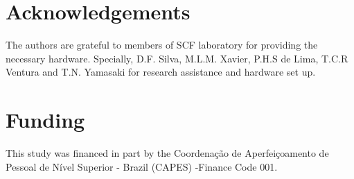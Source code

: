 
\section*{Acknowledgements}
The authors are grateful to members of SCF laboratory for providing the necessary hardware. Specially, D.F. Silva, M.L.M. Xavier, P.H.S de Lima, T.C.R Ventura and T.N. Yamasaki for research assistance and hardware set up.

\section*{Funding}
This study was financed in part by the Coordenação de Aperfeiçoamento de Pessoal de Nível Superior - Brazil (CAPES) -Finance Code 001.
\printbibliography[segment=\therefsegment,heading=subbibliography, title={References}]